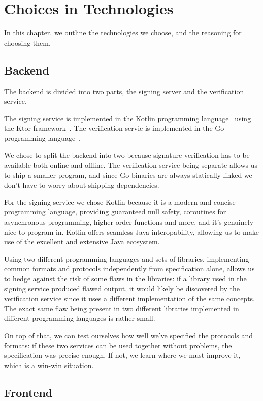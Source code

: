 \chapter{Choices in Technologies}
\label{ch:techchoices}
In this chapter, we outline the technologies we choose, and the reasoning for choosing them.

\section{Backend}
\label{sec:techbackend}
The backend is divided into two parts, the signing server and the verification service.

The signing service is implemented in the Kotlin programming language~\cite{kotlin} using the Ktor framework~\cite{ktor}.
The verification servie is implemented in the Go programming language~\cite{golang}.

We chose to split the backend into two because signature verification has to be available both online and offline.
The verification service being separate allows us to ship a smaller program,
and since Go binaries are always statically linked we don't have to worry about shipping dependencies.

For the signing service we chose Kotlin because it is a modern and concise programming language,
providing guaranteed null safety, coroutines for asynchronous programming, higher-order functions and more,
and it's genuinely nice to program in.
Kotlin offers seamless Java interopability, allowing us to make use of the excellent and extensive Java ecosystem.

Using two different programming languages and sets of libraries,
implementing common formats and protocols independently from specification alone,
allows us to hedge against the risk of some flaws in the libraries: if a library used in the signing service produced flawed output,
it would likely be discovered by the verification service since it uses a different implementation of the same concepts.
The exact same flaw being present in two different libraries implemented in different programming languages is rather small.

On top of that, we can test ourselves how well we've specified the protocols and formats:
if these two services can be used together without problems, the specification was precise enough.
If not, we learn where we must improve it, which is a win-win situation.

\section{Frontend}
\label{sec:techfrontend}

